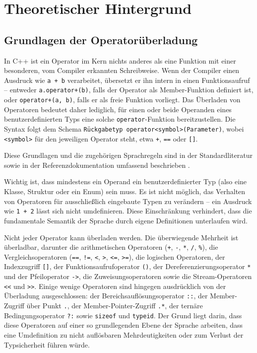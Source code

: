 \documentclass[10pt,a4paper]{article}
\begin{document}
\section{Theoretischer Hintergrund}
\label{sec:theorie}

\subsection{Grundlagen der Operatorüberladung}
In C++ ist ein Operator im Kern nichts anderes als eine Funktion mit einer besonderen, vom Compiler erkannten Schreibweise. Wenn der Compiler einen Ausdruck wie \texttt{a + b} verarbeitet, übersetzt er ihn intern in einen Funktionsaufruf -- entweder \texttt{a.operator+(b)}, falls der Operator als Member-Funktion definiert ist, oder \texttt{operator+(a, b)}, falls er als freie Funktion vorliegt. Das Überladen von Operatoren bedeutet daher lediglich, für einen oder beide Operanden eines benutzerdefinierten Typs eine solche \texttt{operator}-Funktion bereitzustellen. Die Syntax folgt dem Schema \texttt{Rückgabetyp operator<symbol>(Parameter)}, wobei \texttt{<symbol>} für den jeweiligen Operator steht, etwa \texttt{+}, \texttt{==} oder \texttt{[]}.

Diese Grundlagen und die zugehörigen Sprachregeln sind in der Standardliteratur sowie in der Referenzdokumentation umfassend beschrieben \cite{stroustrup2013,cppreference}.

Wichtig ist, dass mindestens ein Operand ein benutzerdefinierter Typ (also eine Klasse, Struktur oder ein Enum) sein muss. Es ist nicht möglich, das Verhalten von Operatoren für ausschließlich eingebaute Typen zu verändern -- ein Ausdruck wie \texttt{1 + 2} lässt sich nicht umdefinieren. Diese Einschränkung verhindert, dass die fundamentale Semantik der Sprache durch eigene Definitionen unterlaufen wird.

Nicht jeder Operator kann überladen werden. Die überwiegende Mehrheit ist überladbar, darunter die arithmetischen Operatoren (\texttt{+}, \texttt{-}, \texttt{*}, \texttt{/}, \texttt{\%}), die Vergleichsoperatoren (\texttt{==}, \texttt{!=}, \texttt{<}, \texttt{>}, \texttt{<=}, \texttt{>=}), die logischen Operatoren, der Indexzugriff \texttt{[]}, der Funktionsaufrufoperator \texttt{()}, der Dereferenzierungsoperator \texttt{*} und der Pfeiloperator \texttt{->}, die Zuweisungsoperatoren sowie die Stream-Operatoren \texttt{<<} und \texttt{>>}. Einige wenige Operatoren sind hingegen ausdrücklich von der Überladung ausgeschlossen: der Bereichsauflösungsoperator \texttt{::}, der Member-Zugriff über Punkt \texttt{.}, der Member-Pointer-Zugriff \texttt{.*}, der ternäre Bedingungsoperator \texttt{?:} sowie \texttt{sizeof} und \texttt{typeid}. Der Grund liegt darin, dass diese Operatoren auf einer so grundlegenden Ebene der Sprache arbeiten, dass eine Umdefinition zu nicht auflösbaren Mehrdeutigkeiten oder zum Verlust der Typsicherheit führen würde.
\end{document}
